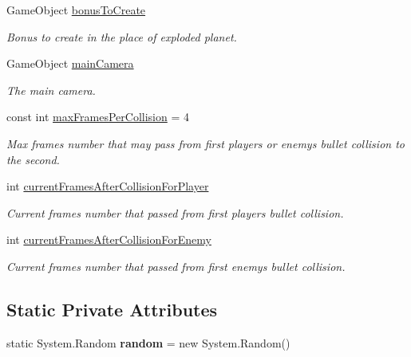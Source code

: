 \begin{DoxyCompactItemize}
Game\+Object \mbox{\hyperlink{class_planet_lifes_controller_ae8bdcd0933ed5c468cec8d5c8cd32028}{bonus\+To\+Create}}
\begin{DoxyCompactList}\small\item\em Bonus to create in the place of exploded planet. \end{DoxyCompactList}\item 
Game\+Object \mbox{\hyperlink{class_planet_lifes_controller_a540a13af26e4129109829b151eab5560}{main\+Camera}}
\begin{DoxyCompactList}\small\item\em The main camera. \end{DoxyCompactList}\item 
const int \mbox{\hyperlink{class_planet_lifes_controller_ad91d33c65093968b2168161369786b51}{max\+Frames\+Per\+Collision}} = 4
\begin{DoxyCompactList}\small\item\em Max frames number that may pass from first player\textquotesingle{}s or enemy\textquotesingle{}s bullet collision to the second. \end{DoxyCompactList}\item 
int \mbox{\hyperlink{class_planet_lifes_controller_af13c51b9ffb9df48b6b8f3252255a8ed}{current\+Frames\+After\+Collision\+For\+Player}}
\begin{DoxyCompactList}\small\item\em Current frames number that passed from first player\textquotesingle{}s bullet collision. \end{DoxyCompactList}\item 
int \mbox{\hyperlink{class_planet_lifes_controller_a4c6041e085fa84eb7460e668842b9ef0}{current\+Frames\+After\+Collision\+For\+Enemy}}
\begin{DoxyCompactList}\small\item\em Current frames number that passed from first enemy\textquotesingle{}s bullet collision. \end{DoxyCompactList}\end{DoxyCompactItemize}
\subsection*{Static Private Attributes}
\begin{DoxyCompactItemize}
\item 
\mbox{\label{class_planet_lifes_controller_a2428a1e8ca01ea37f132e55dec2213a9}} 
static System.\+Random {\bfseries random} = new System.\+Random()
\end{DoxyCompactItemize}


